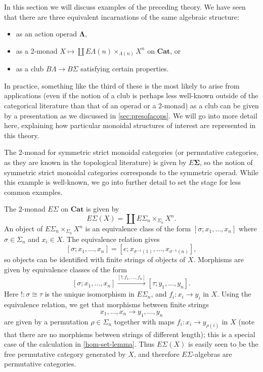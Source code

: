 \documentclass{amsbook} %
\newcommand{\mb}{\mathbf}
\numberwithin{section}{chapter}
\begin{document}
In this section we will discuss examples of the preceding theory.  We have seen that there are three equivalent incarnations of the same algebraic structure:
\begin{itemize}
\item as an action operad $\mb{\Lambda}$,
\item as a 2-monad $X \mapsto \coprod E\Lambda(n) \times_{\Lambda(n)} X^{n}$ on $\mb{Cat}$, or
\item as a club $B\Lambda \rightarrow B\Sigma$ satisfying certain properties.
\end{itemize}
In practice, something like the third of these is the most likely to arise from applications (even if the notion of a club is perhaps less well-known outside of the categorical literature than that of an operad or a 2-monad) as a club can be given by a presentation as we discussed in \cref{sec:presofacops}.  We will go into more detail here, explaining how particular monoidal structures of interest are represented in this theory.


\begin{example}
The 2-monad for symmetric strict monoidal categories (or permutative categories, as they are known in the topological literature) is given by $E \mb{\Sigma}$, so the notion of symmetric strict monoidal categories corresponds to the symmetric operad.  While this example is well-known, we go into further detail to set the stage for less common examples.

The 2-monad $E\Sigma$ on $\mb{Cat}$ is given by
\[
E\Sigma (X) = \coprod E\Sigma_{n} \times_{\Sigma_{n}} X^{n}.
\]
An object of $E\Sigma_{n} \times_{\Sigma_{n}} X^{n}$ is an equivalence class of the form $[\sigma; x_{1}, \ldots, x_{n}]$ where $\sigma \in \Sigma_{n}$ and $x_{i} \in X$.  The equivalence relation gives
\[
[\sigma; x_{1}, \ldots, x_{n}] = [e; x_{\sigma^{-1}(1)}, \ldots, x_{\sigma^{-1}(n)}],
\]
so objects can be identified with finite strings of objects of $X$.  Morphisms are given by equivalence classes of the form
\[
[\sigma; x_{1}, \ldots, x_{n}] \stackrel{[!; f_{1}, \ldots, f_{n}]}{\longrightarrow} [\tau; y_{1}, \ldots, y_{n}].
\]
Here $!:\sigma \cong \tau$ is the unique isomorphism in $E \Sigma_{n}$, and $f_{i}:x_{i} \rightarrow y_{i}$ in $X$.  Using the equivalence relation, we get that morphisms between finite strings
\[
x_{1}, \ldots, x_{n} \rightarrow y_{1}, \ldots, y_{n}
\]
are given by a permutation $\rho \in \Sigma_{n}$ together with maps $f_{i}:x_{i} \rightarrow y_{\rho(i)}$ in $X$ (note that there are no morphisms between strings of different length); this is a special case of the calculation in \ref{hom-set-lemma}.  Thus $E \Sigma(X)$ is easily seen to be the free permutative category generated by $X$, and therefore $E \Sigma$-algebras are permutative categories.
\end{example}
\end{document}
